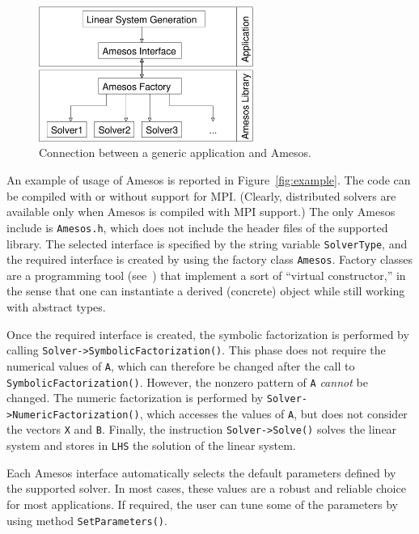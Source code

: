 \documentclass[acmtocl]{acmtrans2m}
\begin{document}
\begin{figure}
\begin{center}
\includegraphics[width=7cm]{amesos_and_application.eps}
\end{center}
\caption{Connection between a generic application and Amesos.}
\label{fig:app}
\end{figure}

An example of usage of Amesos is reported in Figure~\ref{fig:example}. The
code can be compiled with or without support for MPI. (Clearly, distributed
solvers are available only when Amesos is compiled with MPI support.) The only
Amesos include is \verb!Amesos.h!, which does not include the header files of
the supported library. The selected interface is specified by the string
variable \verb!SolverType!, and the required interface is created by using the
factory class \verb!Amesos!. Factory classes are a programming
tool (see~\cite{alexandrescu01modern}) that implement a sort of ``virtual
constructor,'' in the sense that one can instantiate a derived (concrete) object
while still working with abstract types.
 
Once the required interface is created, the symbolic factorization is
performed by calling \verb!Solver->SymbolicFactorization()!.
This phase does not require the numerical values of \verb!A!, which can
therefore be changed after the call to \verb!SymbolicFactorization()!.
However,  the nonzero pattern of \verb!A! {\em cannot} be
changed.
The numeric factorization is performed by
\verb!Solver->NumericFactorization()!, which
accesses the values of \verb!A!, but does not
consider the vectors \verb!X! and \verb!B!. Finally, the instruction
\verb!Solver->Solve()! solves the linear system and stores in \verb!LHS! the
solution of the linear system.

Each Amesos interface automatically selects the default parameters defined by
the supported solver. In most cases, these values are a robust and reliable
choice for most applications. If required, the user can tune some of the
parameters by using method \verb!SetParameters()!.
\end{document}
